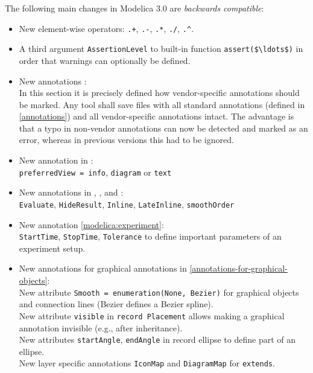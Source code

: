 The following main changes in Modelica 3.0 are \emph{backwards compatible}:
\begin{itemize}
\item
  New element-wise operators: \lstinline!.+!, \lstinline!.-!, \lstinline!.*!, \lstinline!./!, \lstinline!.^!.
\item
  A third argument \lstinline!AssertionLevel! to built-in function \lstinline!assert($\ldots$)! in order that warnings can optionally be defined.
\item
  New annotations :\\
  In this section it is precisely defined how vendor-specific
  annotations should be marked. Any tool shall save files with all
  standard annotations (defined in \cref{annotations}) and all vendor-specific
  annotations intact. The advantage is that a typo in non-vendor
  annotations can now be detected and marked as an error, whereas in
  previous versions this had to be ignored.
\item
  New annotation in :\\
  \lstinline!preferredView = info!, \lstinline!diagram! or \lstinline!text!
\item
  New annotations in , , and :\\
  \lstinline!Evaluate!, \lstinline!HideResult!, \lstinline!Inline!, \lstinline!LateInline!, \lstinline!smoothOrder!
\item
  New annotation \cref{modelica:experiment}:\\
  \lstinline!StartTime!, \lstinline!StopTime!, \lstinline!Tolerance! to define important parameters of an experiment setup.
\item
  New annotations for graphical annotations in \cref{annotations-for-graphical-objects}:\\
  New attribute \lstinline!Smooth = enumeration(None, Bezier)! for graphical objects
  and connection lines (Bezier defines a Bezier spline).\\
  New attribute \lstinline!visible! in \lstinline!record Placement! allows making a graphical
  annotation invisible (e.g., after inheritance).\\
  New attributes \lstinline!startAngle!, \lstinline!endAngle! in record ellipse to define part
  of an ellipse.\\
  New layer specific annotations \lstinline!IconMap! and \lstinline!DiagramMap! for \lstinline!extends!.\\

\end{itemize}
